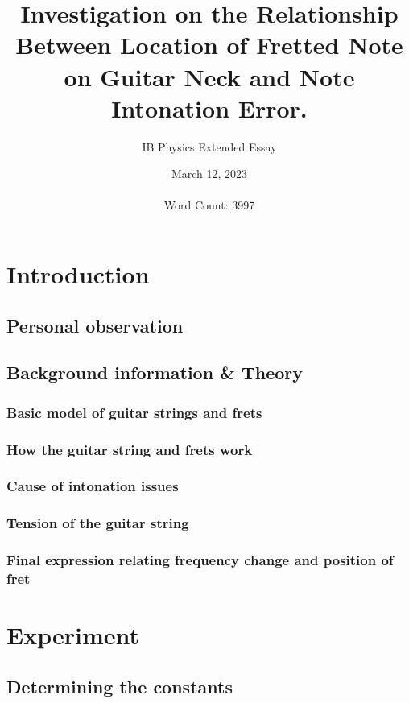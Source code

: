 \documentclass[12pt]{article}
\title{Investigation on the Relationship Between Location of Fretted Note on Guitar Neck and Note Intonation Error.}
\author{IB Physics Extended Essay}
\date{March 12, 2023 \\~\\\tiny Word Count: 3997}
\begin{document}
    \maketitle
    \newpage
    \tableofcontents
    \newpage
    \begin{flushleft}
        \section{Introduction}
            \subsection{Personal observation}
                
            \subsection{Background information \& Theory}
                \subsubsection*{Basic model of guitar strings and frets}
                    
                \subsubsection*{How the guitar string and frets work}
                    
                \subsubsection*{Cause of intonation issues}
                    
                \subsubsection*{Tension of the guitar string}
                    
                \subsubsection*{Final expression relating frequency change and position of fret}
                    
        \section{Experiment}
            
            \subsection{Determining the constants}
                

\end{flushleft}
\end{document}
